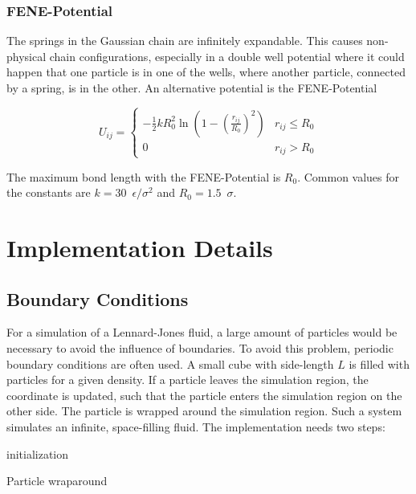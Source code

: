 \documentclass[a4paper]{article}
\begin{document}
\subsubsection{FENE-Potential}

The springs in the Gaussian chain are infinitely expandable. This causes non-physical chain configurations, especially in a double well potential where it could happen that one particle is in one of the wells, where another particle, connected by a spring, is in the other. An alternative potential is the FENE-Potential~\cite{GaryS.Grest1986}

\begin{equation}
U_{ij} =  
\begin{cases}
-\frac{1}{2} k R^2_0 \ln \left( 1 - \left( \frac{r_{ij}}{R_0} \right)^2 \right) & r_{ij} \leq R_0 \\
0 & r_{ij} > R_0
\end{cases}
\end{equation}

The maximum bond length with the FENE-Potential is $R_0$. Common values for the constants are $k = 30 \enspace \epsilon/\sigma^2$ and $R_0 = 1.5 \enspace \sigma$.

\section{Implementation Details}
\label{sec:implementation}

\subsection{Boundary Conditions}

For a simulation of a Lennard-Jones fluid, a  large amount of particles would be necessary to avoid the influence of boundaries. To avoid this problem, periodic boundary conditions are often used. A small cube with side-length $L$ is filled with particles for a given density. If a particle leaves the simulation region, the coordinate is updated, such that the particle enters the simulation region on the other side. The particle is wrapped around the simulation region. Such a system simulates an infinite, space-filling fluid. The implementation needs two steps:

\vspace{12pt}

\begin{algorithm}[H]
 initialization\;
 \caption{Particle wraparound}
 \label{alg:wraparound}
\end{algorithm}
\end{document}
